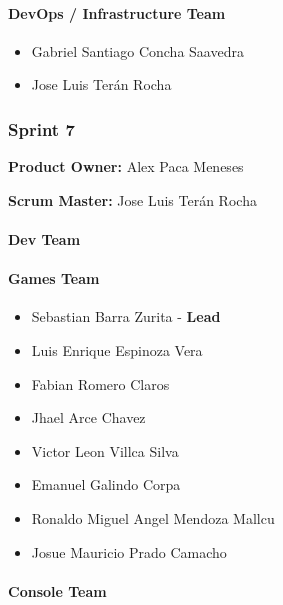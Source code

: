 \paragraph{DevOps / Infrastructure Team}\label{devops-team-6}

\begin{itemize}
\tightlist
\item
  Gabriel Santiago Concha Saavedra
\item
  Jose Luis Terán Rocha
\end{itemize}

\hypertarget{sprint7}{
\subsubsection{\texorpdfstring{\textbf{Sprint
7}}{Sprint 7}}\label{sprint7}}

\textbf{Product Owner: }
Alex Paca Meneses

\textbf{Scrum Master: }
Jose Luis Terán Rocha

\hypertarget{devteam-7}{
\paragraph{\texorpdfstring{\textbf{Dev
Team}}{Dev Team}}\label{devteam-7}}

\paragraph{Games Team}\label{games-team-7}

\begin{itemize}
\tightlist
\item
  Sebastian Barra Zurita - \textbf{Lead}
\item
  Luis Enrique Espinoza Vera
\item
  Fabian Romero Claros 
\item
  Jhael Arce Chavez
\item
  Victor Leon Villca Silva
\item
  Emanuel Galindo Corpa
\item
  Ronaldo Miguel Angel Mendoza Mallcu
\item
  Josue Mauricio Prado Camacho
\end{itemize}

\paragraph{Console Team}\label{console-team-7}

